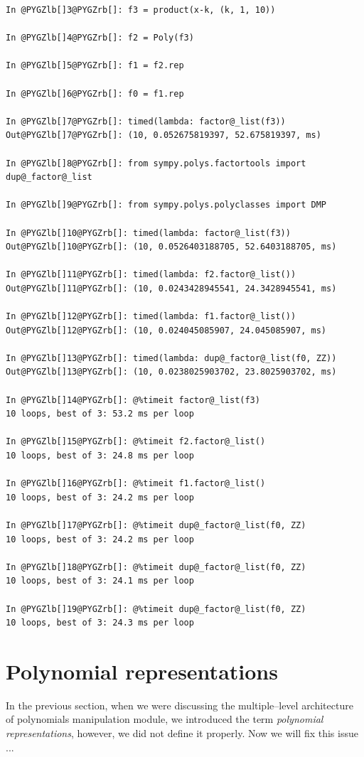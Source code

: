 \begin{Verbatim}[commandchars=@\[\]]
In @PYGZlb[]3@PYGZrb[]: f3 = product(x-k, (k, 1, 10))

In @PYGZlb[]4@PYGZrb[]: f2 = Poly(f3)

In @PYGZlb[]5@PYGZrb[]: f1 = f2.rep

In @PYGZlb[]6@PYGZrb[]: f0 = f1.rep

In @PYGZlb[]7@PYGZrb[]: timed(lambda: factor@_list(f3))
Out@PYGZlb[]7@PYGZrb[]: (10, 0.052675819397, 52.675819397, ms)

In @PYGZlb[]8@PYGZrb[]: from sympy.polys.factortools import dup@_factor@_list

In @PYGZlb[]9@PYGZrb[]: from sympy.polys.polyclasses import DMP

In @PYGZlb[]10@PYGZrb[]: timed(lambda: factor@_list(f3))
Out@PYGZlb[]10@PYGZrb[]: (10, 0.0526403188705, 52.6403188705, ms)

In @PYGZlb[]11@PYGZrb[]: timed(lambda: f2.factor@_list())
Out@PYGZlb[]11@PYGZrb[]: (10, 0.0243428945541, 24.3428945541, ms)

In @PYGZlb[]12@PYGZrb[]: timed(lambda: f1.factor@_list())
Out@PYGZlb[]12@PYGZrb[]: (10, 0.024045085907, 24.045085907, ms)

In @PYGZlb[]13@PYGZrb[]: timed(lambda: dup@_factor@_list(f0, ZZ))
Out@PYGZlb[]13@PYGZrb[]: (10, 0.0238025903702, 23.8025903702, ms)

In @PYGZlb[]14@PYGZrb[]: @%timeit factor@_list(f3)
10 loops, best of 3: 53.2 ms per loop

In @PYGZlb[]15@PYGZrb[]: @%timeit f2.factor@_list()
10 loops, best of 3: 24.8 ms per loop

In @PYGZlb[]16@PYGZrb[]: @%timeit f1.factor@_list()
10 loops, best of 3: 24.2 ms per loop

In @PYGZlb[]17@PYGZrb[]: @%timeit dup@_factor@_list(f0, ZZ)
10 loops, best of 3: 24.2 ms per loop

In @PYGZlb[]18@PYGZrb[]: @%timeit dup@_factor@_list(f0, ZZ)
10 loops, best of 3: 24.1 ms per loop

In @PYGZlb[]19@PYGZrb[]: @%timeit dup@_factor@_list(f0, ZZ)
10 loops, best of 3: 24.3 ms per loop
\end{Verbatim}
\noindent

\section{Polynomial representations}

In the previous section, when we were discussing the multiple--level architecture of polynomials
manipulation module, we introduced the term \emph{polynomial representations}, however, we did not
define it properly. Now we will fix this issue ...

